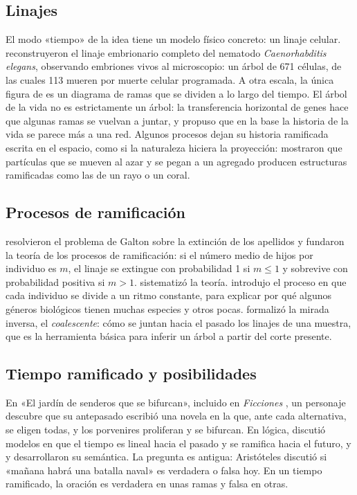 \documentclass[11pt,a4paper]{article}
\begin{document}
\subsection{Linajes}

El modo «tiempo» de la idea tiene un modelo físico concreto: un linaje celular. \textcite{sulston1983} reconstruyeron el linaje embrionario completo del nematodo \emph{Caenorhabditis elegans}, observando embriones vivos al microscopio: un árbol de 671 células, de las cuales 113 mueren por muerte celular programada. A otra escala, la única figura de \textcite{darwin1859} es un diagrama de ramas que se dividen a lo largo del tiempo. El árbol de la vida no es estrictamente un árbol: la transferencia horizontal de genes hace que algunas ramas se vuelvan a juntar, y \textcite{doolittle1999} propuso que en la base la historia de la vida se parece más a una red. Algunos procesos dejan su historia ramificada escrita en el espacio, como si la naturaleza hiciera la proyección: \textcite{witten1981} mostraron que partículas que se mueven al azar y se pegan a un agregado producen estructuras ramificadas como las de un rayo o un coral.

\subsection{Procesos de ramificación}

\textcite{watson1875} resolvieron el problema de Galton sobre la extinción de los apellidos y fundaron la teoría de los procesos de ramificación: si el número medio de hijos por individuo es $m$, el linaje se extingue con probabilidad 1 si $m \le 1$ y sobrevive con probabilidad positiva si $m > 1$. \textcite{harris1963} sistematizó la teoría. \textcite{yule1925} introdujo el proceso en que cada individuo se divide a un ritmo constante, para explicar por qué algunos géneros biológicos tienen muchas especies y otros pocas. \textcite{kingman1982} formalizó la mirada inversa, el \emph{coalescente}: cómo se juntan hacia el pasado los linajes de una muestra, que es la herramienta básica para inferir un árbol a partir del corte presente.

\subsection{Tiempo ramificado y posibilidades}

En «El jardín de senderos que se bifurcan», incluido en \emph{Ficciones} \parencite{borges1944}, un personaje descubre que su antepasado escribió una novela en la que, ante cada alternativa, se eligen todas, y los porvenires proliferan y se bifurcan. En lógica, \textcite{prior1967} discutió modelos en que el tiempo es lineal hacia el pasado y se ramifica hacia el futuro, y \textcite{thomason1970} y \textcite{belnap2001} desarrollaron su semántica. La pregunta es antigua: Aristóteles discutió si «mañana habrá una batalla naval» es verdadera o falsa hoy. En un tiempo ramificado, la oración es verdadera en unas ramas y falsa en otras.
\end{document}

